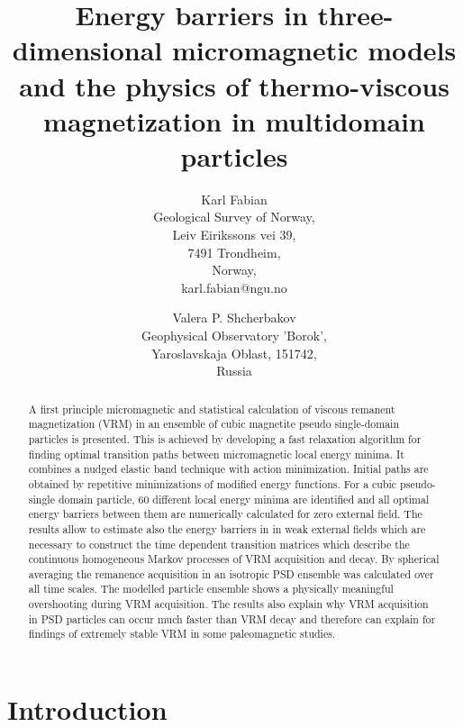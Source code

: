 \documentclass[a4paper]{article}
\begin{document}
\title{
Energy barriers in three-dimensional micromagnetic models and the physics of thermo-viscous magnetization in multidomain particles}



\author{Karl Fabian \\
	Geological Survey of Norway,\\
Leiv Eirikssons vei 39,\\
7491 Trondheim,\\
Norway,\\
karl.fabian@ngu.no
	\and
	Valera P. Shcherbakov  \\
	Geophysical Observatory 'Borok',\\  Yaroslavskaja Oblast, 151742,\\ Russia \\
	}

\maketitle

\begin{abstract}
A first principle micromagnetic and statistical
calculation of
viscous remanent magnetization (VRM)  in an ensemble of cubic magnetite
pseudo single-domain particles
is presented.
This is achieved by developing
a fast relaxation algorithm for finding optimal
transition paths between micromagnetic local energy minima.
It combines a nudged elastic band technique with action minimization.
Initial paths are obtained by repetitive minimizations of
modified energy functions.
For a cubic pseudo-single domain particle, 60 different local energy minima are
identified and all optimal energy barriers between them
are numerically calculated for zero external field.
The results allow to  estimate also the energy barriers in
in weak external fields which are necessary to
construct the  time dependent  transition  matrices which describe  the continuous
homogeneous Markov processes of VRM acquisition and decay.
By   spherical averaging the
remanence acquisition in an isotropic PSD ensemble was calculated
over all time scales.
The modelled particle ensemble shows a physically meaningful overshooting
during VRM  acquisition.
The results also explain why
VRM acquisition  in PSD particles can occur much faster than
VRM decay and therefore can explain  for findings of extremely
stable VRM in some paleomagnetic studies.
\end{abstract}

 
\section{Introduction}

\end{document}
